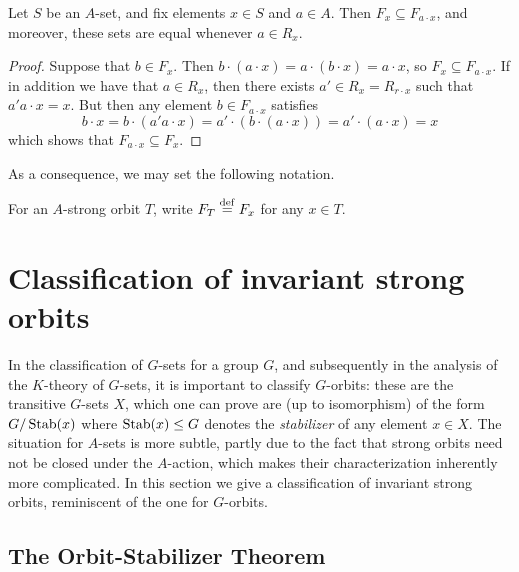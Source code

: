 \documentclass[11pt]{amsart}
\begin{document}
\begin{lemma} \label{lem:fixinv}
  Let $S$ be an $A$-set, and fix elements $x\in S$ and $a\in A$. Then $F_x \subseteq F_{a \cdot x}$, and moreover, these sets are equal whenever $a\in R_x$.
\end{lemma}

\begin{proof}
    Suppose that $b\in F_x$.  Then $b\cdot (a\cdot x) = a\cdot (b\cdot x) = a \cdot x$, so $F_x \subseteq F_{a \cdot x}$.  If in addition we have that  $a\in R_x$, then there exists $a'\in R_x = R_{r\cdot x}$ such that $a'a \cdot x = x$.  But then any element $b\in F_{a\cdot x}$ satisfies \[b\cdot x=b\cdot (a'a\cdot x)=a'\cdot(b\cdot (a\cdot x))=a'\cdot (a\cdot x)=x\] which shows that $F_{a\cdot x}\subseteq F_x$. 
\end{proof}

As a consequence, we may set the following notation.

\begin{definition} \label{def:F_T}
    For an $A$-strong orbit $T$, write $F_T\mathrel{\stackrel{\mathrm{def}}=} F_x$ for any $x\in T$.
\end{definition}







\section{Classification of invariant strong orbits}\label{section:classifying.ambits}



In the classification of $G$-sets for a group $G$, and subsequently in the analysis of the $K$-theory of $G$-sets, it is important to classify $G$-orbits: these are the transitive $G$-sets $X$, which one can prove are (up to isomorphism) of the form $G/\operatorname{Stab}(x)$ where $\operatorname{Stab}(x)\leq G$ denotes the \emph{stabilizer} of any element $x\in X$.   The situation for $A$-sets is more subtle, partly due to the fact that strong orbits need not be closed under the $A$-action, which makes their characterization inherently more complicated. In this section we give a classification of invariant strong orbits, reminiscent of the one for $G$-orbits.

\subsection{The Orbit-Stabilizer Theorem}
\end{document}

